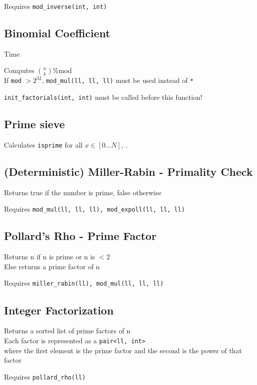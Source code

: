 Requires \verb|mod_inverse(int, int)|



\subsection{Binomial Coefficient}
 Time

Computes $\binom{n}{k}$\:\%\:mod \\
If \verb|mod| $> 2^{32}$, \verb|mod_mul(ll, ll, ll)| must be used instead of \verb|*|

\verb|init_factorials(int, int)| must be called before this function!



\subsection{Prime sieve}
Calculates \verb|isprime| for all $x \in [0 \ldots N]$, .


\subsection{(Deterministic) Miller-Rabin - Primality Check}
Returns true if the number is prime, false otherwise

Requires \verb|mod_mul(ll, ll, ll), mod_expoll(ll, ll, ll)|



\subsection{Pollard's Rho - Prime Factor}
Returns n if n is prime or n is $< 2$ \\
Else returns a prime factor of n

Requires \verb|miller_rabin(ll), mod_mul(ll, ll, ll)|



\subsection{Integer Factorization}
Returns a sorted list of prime factors of n \\
Each factor is represented as a \verb|pair<ll, int>| \\
where the first element is the prime factor and the second is the power of that factor

Requires \verb|pollard_rho(ll)|



